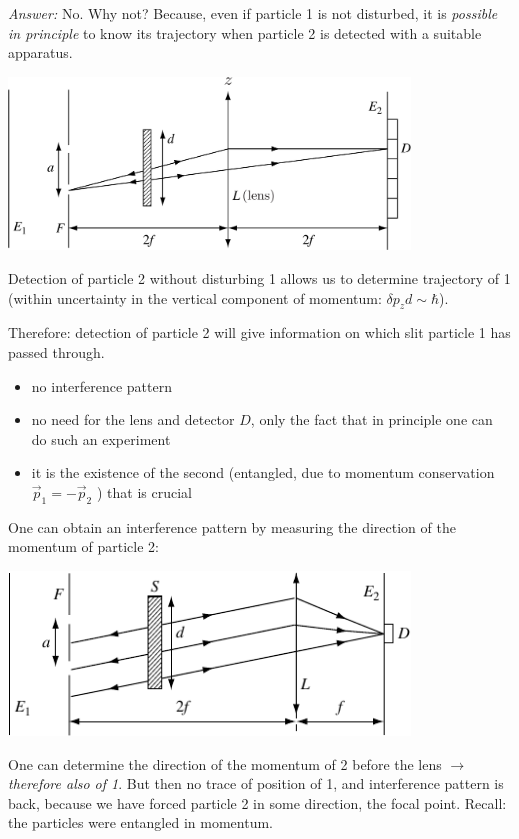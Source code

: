 \documentclass[12pt]{article}
\begin{document}
\emph{Answer:} No. Why not? Because, even if particle 1
is not disturbed, it is \emph{possible in principle}
to know its trajectory when particle 2 is
detected with a suitable apparatus.
\begin{center}
\includegraphics[width=0.8\textwidth]{Figures/InterferenceEntangled1.pdf}
\end{center}

Detection of particle 2
without disturbing 1
allows us to determine
trajectory of 1 (within
uncertainty in the vertical
component of momentum: $\delta p_z d \sim \hbar$).

Therefore: detection of particle 2 will give information
on which slit particle 1 has passed through.
\begin{itemize}
\item no interference pattern
\item no need for the lens and detector \(D\), only
the fact that in principle one can do
such an experiment
\item it is the existence of the second (entangled,
due to momentum conservation \(\vec{p}_{1}=-\vec{p}_{2}\) ) that
is crucial
\end{itemize}
One can obtain an interference pattern by measuring
the direction of the momentum of particle 2:
\begin{center}
\includegraphics[width=0.8\textwidth]{Figures/InterferenceEntangled2.pdf}
\end{center}

One can determine the
direction of the momentum
of 2 before the lens $\to$
\emph{therefore also of 1}.
But then no trace of position of 1, and
interference pattern is back, because we
have forced particle 2 in some direction,
the focal point. Recall: the particles
were entangled in momentum.
\end{document}
